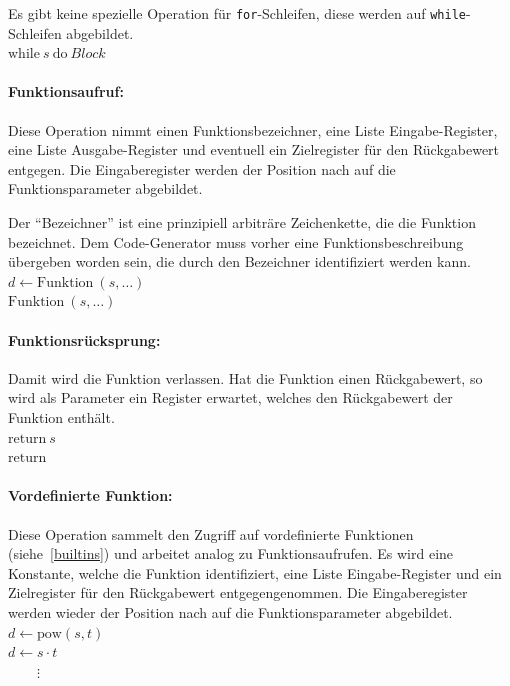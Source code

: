 \documentclass[twoside,a4paper,fleqn,12pt]{article}
\begin{document}
Es gibt keine spezielle Operation für \texttt{for}-Schleifen, diese werden auf \texttt{while}-Schleifen abgebildet.
\\\hspace*{1cm}$\mathrm{while}\ s\ \mathrm{do}\ \mathit{Block}$

\paragraph{Funktionsaufruf:} Diese Operation nimmt einen Funktionsbezeichner, eine Liste Eingabe-Register, eine Liste Ausgabe-Register
und eventuell ein Zielregister für den Rückgabewert entgegen. Die Eingaberegister werden der Position nach auf die Funktionsparameter abgebildet.

Der "`Bezeichner"' ist eine prinzipiell arbiträre Zeichenkette, die die Funktion bezeichnet. Dem Code-Generator muss
vorher eine Funktionsbeschreibung übergeben worden sein, die durch den Bezeichner identifiziert werden kann.
\\\hspace*{1cm}$d \gets \mathrm{Funktion}\ (s, \dots)$
\\\hspace*{1cm}$\mathrm{Funktion}\ (s, \dots)$

\paragraph{Funktionsrücksprung:} Damit wird die Funktion verlassen. Hat die Funktion einen Rückgabewert, so wird als Parameter ein Register
erwartet, welches den Rückgabewert der Funktion enthält.
\\\hspace*{1cm}$\mathrm{return}\ s$
\\\hspace*{1cm}$\mathrm{return}$

\paragraph{Vordefinierte Funktion:} Diese Operation sammelt den Zugriff auf vordefinierte Funktionen (siehe~\ref{builtins})
und arbeitet analog zu Funktionsaufrufen. Es wird eine Konstante, welche die Funktion identifiziert, eine Liste Eingabe-Register 
und ein Zielregister für den Rückgabewert entgegengenommen. Die Eingaberegister werden wieder der Position nach auf die Funktionsparameter abgebildet.
\\\hspace*{1cm}$d \gets \mathrm{pow}(s, t)$
\\\hspace*{1cm}$d \gets s \cdot t$
\\\hspace*{1cm}$\phantom{d \gets}\vdots$
\end{document}
